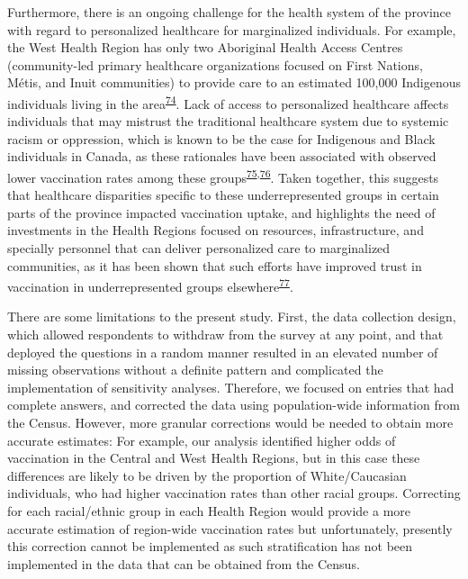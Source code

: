 \documentclass[
]{article}
\begin{document}
Furthermore, there is an ongoing challenge for the health system of the
province with regard to personalized healthcare for marginalized
individuals. For example, the West Health Region has only two Aboriginal
Health Access Centres (community-led primary healthcare organizations
focused on First Nations, Métis, and Inuit communities) to provide care
to an estimated 100,000 Indigenous individuals living in the
area\textsuperscript{\protect\hyperlink{ref-ontariohealth}{74}}. Lack of
access to personalized healthcare affects individuals that may mistrust
the traditional healthcare system due to systemic racism or oppression,
which is known to be the case for Indigenous and Black individuals in
Canada, as these rationales have been associated with observed lower
vaccination rates among these
groups\textsuperscript{\protect\hyperlink{ref-smylie2022}{75},\protect\hyperlink{ref-eissa2021}{76}}.
Taken together, this suggests that healthcare disparities specific to
these underrepresented groups in certain parts of the province impacted
vaccination uptake, and highlights the need of investments in the Health
Regions focused on resources, infrastructure, and specially personnel
that can deliver personalized care to marginalized communities, as it
has been shown that such efforts have improved trust in vaccination in
underrepresented groups
elsewhere\textsuperscript{\protect\hyperlink{ref-schafferderoo2020}{77}}.

There are some limitations to the present study. First, the data
collection design, which allowed respondents to withdraw from the survey
at any point, and that deployed the questions in a random manner
resulted in an elevated number of missing observations without a
definite pattern and complicated the implementation of sensitivity
analyses. Therefore, we focused on entries that had complete answers,
and corrected the data using population-wide information from the
Census. However, more granular corrections would be needed to obtain
more accurate estimates: For example, our analysis identified higher
odds of vaccination in the Central and West Health Regions, but in this
case these differences are likely to be driven by the proportion of
White/Caucasian individuals, who had higher vaccination rates than other
racial groups. Correcting for each racial/ethnic group in each Health
Region would provide a more accurate estimation of region-wide
vaccination rates but unfortunately, presently this correction cannot be
implemented as such stratification has not been implemented in the data
that can be obtained from the Census.
\end{document}
